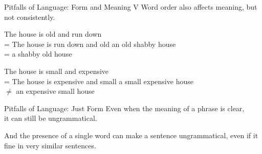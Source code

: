 \documentclass[xcolor={usenames,svgnames,x11names,dvipsnames,table}]{beamer}
\begin{document}
\begin{frame}{Pitfalls of Language: Form and Meaning V}
    Word order also affects meaning, but not consistently.
    \begin{exe}
        \small
        \ex
        \begin{xlist}
            \ex The house is old and run down\\
                = The house is run down and old
            \ex an old shabby house\\
                = a shabby old house
        \end{xlist}
        \ex
        \begin{xlist}
            \ex The house is small and expensive\\
            = The house is expensive and small
            \ex a small expensive house\\
            $\neq$ an expensive small house
        \end{xlist}
    \end{exe}
\end{frame}

\begin{frame}{Pitfalls of Language: Just Form}
    Even when the meaning of a phrase is clear,\\
    it can still be ungrammatical.
    \begin{exe}
        \small
        \ex
        \begin{xlist}
        \end{xlist}
        \ex
        \begin{xlist}
        \end{xlist}
    \end{exe}

    \pause
    And the presence of a single word can make a sentence ungrammatical, even if it fine in very similar sentences.
    \begin{exe}
        \small
        \ex
        \begin{xlist}
        \end{xlist}
        \ex
        \begin{xlist}
        \end{xlist}
    \end{exe}
\end{frame}
\end{document}
